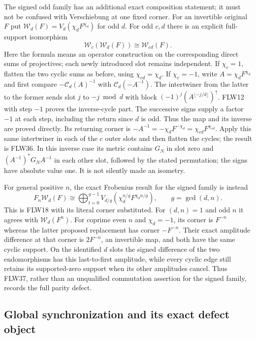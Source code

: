 The signed odd family has an additional exact composition statement;
it must not be confused with Verschiebung at one fixed corner.
For an invertible original $F$ put
$\mathcal W_d(F)=V_d(\chi_d F^{\chi_d})$ for odd $d$.
For odd $c,d$ there is an explicit full-support isomorphism
\[
 \mathcal W_c(\mathcal W_d(F))\cong\mathcal W_{cd}(F).
 \tag{FLW36}
\]
Here the formula means an operator construction on the corresponding
direct sums of projectives; each newly introduced slot remains
independent. If $\chi_c=1$, flatten the two cyclic sums as before,
using $\chi_{cd}=\chi_d$.
If $\chi_c=-1$, write $A=\chi_dF^{\chi_d}$ and first compare
$-\mathcal C_d(A)^{-1}$ with $\mathcal C_d(-A^{-1})$.
The intertwiner from the latter to the former sends slot $j$ to
$-j\bmod d$ with block
$(-1)^j(A^{\lfloor-j/d\rfloor})^\uparrow$.
FLW12 with step $-1$ proves the inverse-cycle part. The successive
signs supply a factor $-1$ at each step, including the return since
$d$ is odd. Thus the map and its inverse are proved directly.
Its returning corner is
$-A^{-1}=-\chi_dF^{-\chi_d}=\chi_{cd}F^{\chi_{cd}}$.
Apply this same intertwiner in each of the $c$ outer slots and
then flatten the cycles; the result is FLW36.
In this inverse case its metric contains $G_N$ in slot zero and
$(A^{-1})^*G_NA^{-1}$ in each other slot, followed by the stated
permutation; the signs have absolute value one. It is not silently
made an isometry.

For general positive $n$, the exact Frobenius result for the signed
family is instead
\[
 F_n\mathcal W_d(F)
 \cong\bigoplus_{t=0}^{g-1}
 V_{d/g}(\chi_d^{n/g}F^{\chi_d n/g}),\qquad g=\gcd(d,n).
 \tag{FLW37}
\]
This is FLW18 with its literal corner substituted. For $(d,n)=1$
and odd $n$ it agrees with $\mathcal W_d(F^n)$.
For coprime even $n$ and $\chi_d=-1$, its corner is $F^{-n}$ whereas
the latter proposed replacement has corner $-F^{-n}$.
Their exact amplitude difference at that corner is $2F^{-n}$,
an invertible map, and both have the same cyclic support.
On the identified $d$ slots the signed difference of the two
endomorphisms has this last-to-first amplitude, while every
cyclic edge still retains its supported-zero support when its
other amplitudes cancel. Thus FLW37, rather than an unqualified
commutation assertion for the signed family, records the full
parity defect.

\subsection{Global synchronization and its exact defect object}

